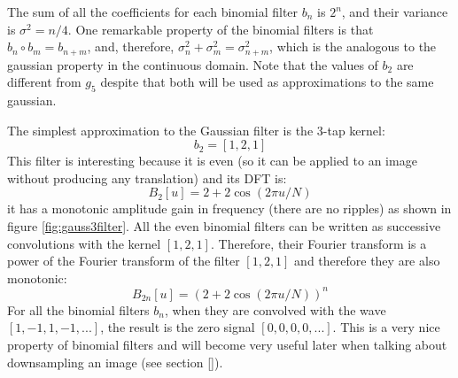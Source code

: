 The sum of all the coefficients for each binomial filter $b_n$ is $2^n$, and their variance is $\sigma^2 = n/4$. One remarkable property of the binomial filters is that $b_n \circ b_m = b_{n+m}$, and, therefore, $\sigma_n^2 + \sigma_m^2  = \sigma_{n+m}^2$, which is the analogous to the gaussian property in the continuous domain. Note that the values of $b_2$ are different from $g_5$ despite that both will be used as approximations to the same gaussian. 

The simplest approximation to the Gaussian filter is the 3-tap kernel:
\begin{equation}
b_2 = \left[1, 2, 1\right] 
\end{equation}
This filter is interesting because it is even (so it can be applied to an image without producing any translation) and its DFT is:
\begin{equation}
B_2 \left[u\right] = 2+2 \cos (2 \pi u/N)
\end{equation}
it has a monotonic amplitude gain in frequency (there are no ripples) as shown in figure \ref{fig:gauss3filter}.  All the even binomial filters can be written as successive convolutions with the kernel $\left[1,2,1\right]$. Therefore, their Fourier transform is a power of the Fourier transform of the filter $\left[1,2,1\right]$ and therefore they are also monotonic:
\begin{equation}
B_{2n} \left[u\right] = (2+2 \cos (2 \pi u/N))^n
\end{equation}
For all the binomial filters $b_n$, when they are convolved with the wave $\left[1,-1,1,-1,...\right]$, the result is the zero signal $\left[0,0,0,0,...\right]$. This is a very nice property of binomial filters and will become very useful later when talking about downsampling an image (see section \ref{}). 

